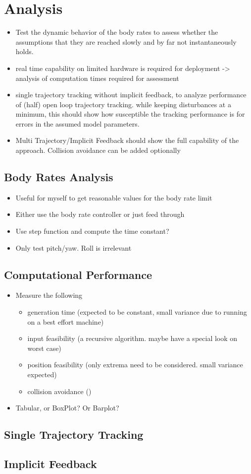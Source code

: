 \chapter{Analysis}
\begin{itemize}
	\color{red}
	\item Test the dynamic behavior of the body rates to assess whether the assumptions that they are reached slowly and by far not instantaneously holds.
	\item real time capability on limited hardware is required for deployment -> analysis of computation times required for assessment
	\item single trajectory tracking without implicit feedback, to analyze performance of (half) open loop trajectory tracking. while keeping disturbances at a minimum, this should show how susceptible the tracking performance is for errors in the assumed model parameters.
	\item Multi Trajectory/Implicit Feedback should show the full capability of the approach. Collision avoidance can be added optionally
\end{itemize}

\section{Body Rates Analysis}

\begin{itemize}
	\color{red}
	\item Useful for myself to get reasonable values for the body rate limit
	\item Either use the body rate controller or just feed through
	\item Use step function and compute the time constant?
	\item Only test pitch/yaw. Roll is irrelevant
\end{itemize}

\section{Computational Performance}

\begin{itemize}
	\color{red}
	\item Measure the following
	\begin{itemize}
		\item generation time (expected to be constant, small variance due to running on a best effort machine)
		\item input feasibility (a recursive algorithm. maybe have a special look on worst case)
		\item position feasibility (only extrema need to be considered. small variance expected)
		\item collision avoidance ()
	\end{itemize}
	\item Tabular, or BoxPlot? Or Barplot? 
\end{itemize}

\section{Single Trajectory Tracking}


\section{Implicit Feedback}